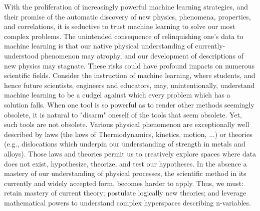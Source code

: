 With the proliferation of increasingly powerful machine learning strategies, and their promise of the automatic discovery of new physics, phenomena, properties, and correlations, it is seductive to trust machine learning to solve our most complex problems. The unintended consequence of relinquishing one's data to machine learning is that our native physical understanding of currently-understood phenomenon may atrophy, and our development of descriptions of new physics may stagnate.  These risks could have profound impacts on numerous scientific fields. Consider the instruction of machine learning, where students, and hence future scientists, engineers and educators, may, unintentionally, understand machine learning to be a cudgel against which every problem which has a solution falls. When one tool is so powerful as to render other methods seemingly obsolete, it is natural to "disarm" oneself of the tools that seem obsolete.  Yet, such tools are not obsolete.  Various physical phenomenon are exceptionally well described by laws (the laws of Thermodynamics, kinetics, motion, ...) or theories (e.g., dislocations which underpin our understanding of strength in metals and alloys).  Those laws and theories permit us to creatively explore spaces where data does not exist, hypothesize, theorize, and test our hypotheses.  In the absence a mastery of our understanding of physical processes, the scientific method in its currently and widely accepted form, becomes harder to apply.  Thus, we must: retain mastery of current theory; postulate logically new theories; and leverage mathematical powers to understand complex hyperspaces describing n-variables. \\

